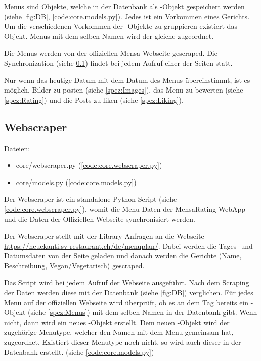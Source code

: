 Menus sind Objekte, welche in der Datenbank als -Objekt gespeichert
werden (siehe \ref{fig:DB}, \ref{code:core.models.py}). Jedes  ist
ein Vorkommen eines Gerichts. Um die verschiedenen Vorkommen der
-Objekte zu gruppieren existiert das -Objekt.
Menus mit dem selben Namen wird der gleiche  zugeordnet. 

Die Menus werden von der offiziellen Mensa Webseite gescraped. Die
Synchronization (siehe \ref{spez:Webscraper}) findet bei jedem Aufruf einer der
Seiten statt.

Nur wenn das heutige Datum mit dem Datum des Menus übereinstimmt, ist es
möglich, Bilder zu posten (siehe \ref{spez:Images}), das Menu zu bewerten (siehe
\ref{spez:Rating}) und die Posts zu liken (siehe \ref{spez:Liking}).

\subsection{Webscraper} \label{spez:Webscraper}

Dateien:
\begin{itemize}
    \item core/webscraper.py (\ref{code:core.webscraper.py})
    \item core/models.py (\ref{code:core.models.py})
\end{itemize}

Der Webscraper ist ein standalone Python Script (siehe
\ref{code:core.webscraper.py}), womit die Menu-Daten der MensaRating WebApp und
die Daten der Offiziellen Webseite synchronisiert werden. 

Der Webscraper stellt mit der Library  Anfragen an die Webseite
\url{https://neuekanti.sv-restaurant.ch/de/menuplan/}. Dabei werden die Tages-
und Datumsdaten von der Seite geladen und danach werden die Gerichte (Name,
Beschreibung, Vegan/Vegetarisch) gescraped.

Das Script wird bei jedem Aufruf der Webseite ausgeführt. Nach dem Scraping der
Daten werden diese mit der Datenbank (siehe \ref{fig:DB}) verglichen. Für jedes
Menu auf der offiziellen Webseite wird überprüft, ob es an dem Tag bereits ein
-Objekt (siehe \ref{spez:Menus}) mit dem selben Namen in der
Datenbank gibt. Wenn nicht, dann wird ein neues -Objekt erstellt. Dem
neuen -Objekt wird der zugehörige Menutype, welcher den Namen mit dem
Menu gemeinsam hat, zugeordnet. Existiert dieser Menutype noch nicht, so wird
auch dieser in der Datenbank erstellt. (siehe \ref{code:core.models.py})

